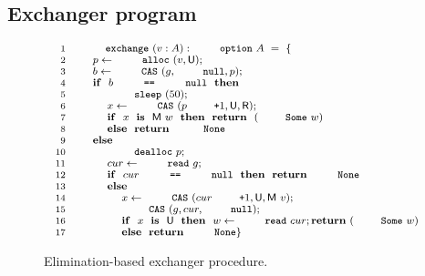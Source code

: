 \subsection{Exchanger program} 
\label{sec:exchanger}

\newcommand{\Unmatched}{{\mathsf{U}}}
\newcommand{\Matched}[1]{{\mathsf{M}\ #1}}
\newcommand{\Retired}{{\mathsf{R}}}


{
\begin{figure}
\centering
\[
{\small{
\begin{array}{rl}
 \Num{1} & \esc{exchange}~(v : A) : \esc{option}~A~=~\{ 
\\ 
 \Num{2} & ~~~~ p \Asgn \esc{alloc}~(v, \Unmatched);\\
 \Num{3} & ~~~~ b \Asgn \esc{CAS}~(g, \esc{null}, p);\\
 \Num{4} & ~~~~ \kw{if}~~b~\esc{==}~\esc{null}~~\kw{then}\\
 \Num{5} & ~~~~ ~~~~ \esc{sleep}~(50);\\
 \Num{6} & ~~~~ ~~~~ x \Asgn \esc{CAS}~(p\esc{+}1, \Unmatched, \Retired);\\
 \Num{7} & ~~~~ ~~~~ \kw{if}~~x~~\kw{is}~~\Matched w~~\kw{then}~~\kw{return}~~(\esc{Some}~w)\\
 \Num{8} & ~~~~ ~~~~ \kw{else}~~\kw{return}~~\esc{None}\\
 \Num{9} & ~~~~ \kw{else}\\
\Num{10} & ~~~~ ~~~~ \esc{dealloc}~p;\\
\Num{11} & ~~~~ ~~~~ cur \Asgn \esc{read}~g;\\
\Num{12} & ~~~~ ~~~~ \kw{if}~~cur~\esc{==}~\esc{null}~~\kw{then}~~\kw{return}~{\esc{None}}\\
\Num{13} & ~~~~ ~~~~ \kw{else}\\
\Num{14} & ~~~~ ~~~~ ~~~~ x \Asgn \esc{CAS}~(cur\esc{+}1, \Unmatched, \Matched v);\\
\Num{15} & ~~~~ ~~~~ ~~~~ \esc{CAS}~(g, cur, \esc{null});\\
\Num{16} & ~~~~ ~~~~ ~~~~ \kw{if}~~x~~\kw{is}~~\Unmatched~~\kw{then}~~w\Asgn \esc{read}~cur;\kw{return}~(\esc{Some}\ w)\\
\Num{17} & ~~~~ ~~~~ ~~~~ \kw{else}~~\kw{return}~\esc{None}\}
\end{array}
}}
\]
\caption{Elimination-based exchanger procedure.}
\label{fig:exchanger}
\end{figure} 
}

